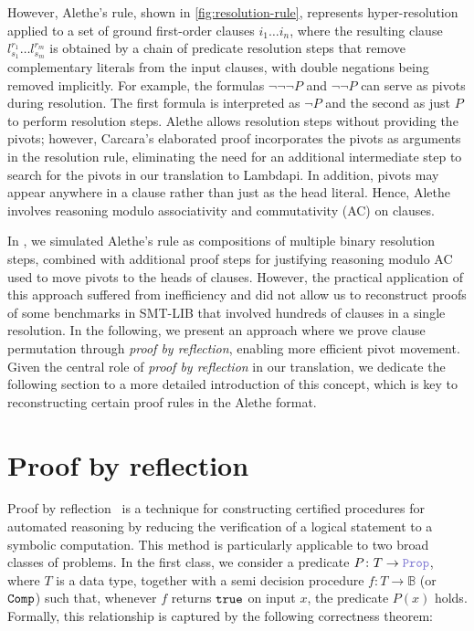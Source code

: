 However, Alethe's  rule, shown in \cref{fig:resolution-rule}, represents hyper-resolution applied to a set of ground first-order clauses $i_1 \dots i_n$,
where the resulting clause $l_{s_1}^{r_1} \dots l_{s_m}^{r_m}$ is obtained by a chain of predicate resolution steps that remove complementary literals from the input clauses, with double negations being removed implicitly.
For example, the formulas $\neg \neg \neg P$ and $\neg \neg P$ can serve as pivots during resolution.
The first formula is interpreted as $\neg P$ and the second as just $P$ to perform resolution steps.
Alethe allows resolution steps without providing the pivots; however, Carcara's elaborated proof incorporates the pivots as arguments in the resolution rule, eliminating the need for an additional intermediate step to search for the pivots in our translation to Lambdapi.
In addition, pivots may appear anywhere in a clause rather than just as the head literal. Hence, Alethe  involves reasoning modulo associativity and commutativity (AC) on clauses.

In \cite{ColtellacciMD24}, we simulated Alethe's  rule as compositions of multiple binary resolution steps, combined with additional proof steps for justifying reasoning modulo AC used to move pivots to the heads of clauses.
However, the practical application of this approach suffered from inefficiency and did not allow us to reconstruct proofs of some benchmarks in SMT-LIB that involved hundreds of clauses in a single resolution.
In the following, we present an approach where we prove clause permutation through \emph{proof by reflection}, enabling more efficient pivot movement.
Given the central role of \emph{proof by reflection} in our translation, we dedicate the following section to a more detailed introduction of this concept, which is key to reconstructing certain proof rules in the Alethe format. 

\section{Proof by reflection}
\label{ssec:reflection-intro}

Proof by reflection~\cite{reflection-origin-coq} is a technique for constructing certified procedures for automated reasoning by reducing the verification of a logical statement to a symbolic computation.
This method is particularly applicable to two broad classes of problems. In the first class, we consider a predicate $P \colon T \to \prop$, where $T$ is a data type,
together with a semi decision procedure $f: T \to \mathbb{B}$ (or $\tt{Comp}$) such that, whenever $f$ returns $\tt{true}$ on input $x$, the predicate $P(x)$ holds.
Formally, this relationship is captured by the following correctness theorem:

